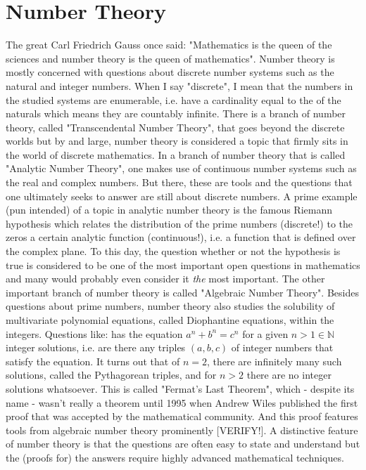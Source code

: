 \chapter{Number Theory}
The great Carl Friedrich Gauss once said: "Mathematics is the queen of the sciences and number theory is the queen of mathematics". Number theory is mostly concerned with questions about discrete number systems such as the natural and integer numbers. When I say "discrete", I mean that the numbers in the studied systems are enumerable, i.e. have a cardinality equal to the of the naturals which means they are countably infinite. There is a branch of number theory, called "Transcendental Number Theory", that goes beyond the discrete worlds but by and large, number theory is considered a topic that firmly sits in the world of discrete mathematics. In a branch of number theory that is called "Analytic Number Theory", one makes use of continuous number systems such as the real and complex numbers. But there, these are tools and the questions that one ultimately seeks to answer are still about discrete numbers. A prime example (pun intended) of a topic in analytic number theory is the famous Riemann hypothesis which relates the distribution of the prime numbers (discrete!) to the zeros a certain analytic function (continuous!), i.e. a function that is defined over the complex plane. To this day, the question whether or not the hypothesis is true is considered to be one of the most important open questions in mathematics and many would probably even consider it \emph{the} most important. The other important branch of number theory is called "Algebraic Number Theory". Besides questions about prime numbers, number theory also studies the solubility of multivariate polynomial equations, called Diophantine equations, within the integers. Questions like: has the equation $a^n + b^n = c^n$ for a given $n > 1 \in \mathbb{N}$ integer solutions, i.e. are there any triples $(a,b,c)$ of integer numbers that satisfy the equation. It turns out that of $n=2$, there are infinitely many such solutions, called the Pythagorean triples, and for $n > 2$ there are no integer solutions whatsoever. This is called "Fermat's Last Theorem", which - despite its name - wasn't really a theorem until 1995 when Andrew Wiles published the first proof that was accepted by the mathematical community. And this proof features tools from algebraic number theory prominently [VERIFY!]. A distinctive feature of number theory is that the questions are often easy to state and understand but the (proofs for) the answers require highly advanced mathematical techniques.


